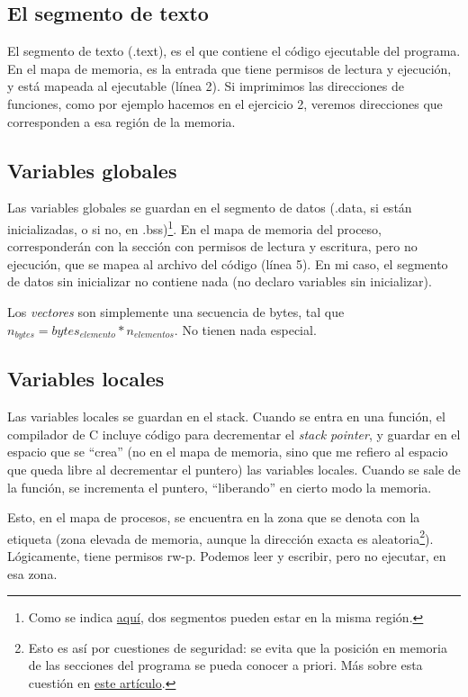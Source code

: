 \documentclass[a4paper]{article}
\begin{document}
\subsection{El segmento de texto}

El segmento de texto ({\ttfamily .text}), es el que contiene el código ejecutable del programa. En el mapa de memoria, es la entrada que tiene permisos de lectura y ejecución, y está mapeada al ejecutable (línea 2). Si imprimimos las direcciones de funciones, como por ejemplo hacemos en el ejercicio 2, veremos direcciones que corresponden a esa región de la memoria.

\subsection{Variables globales}

Las variables globales se guardan en el segmento de datos ({\ttfamily.data}, si están inicializadas, o si no, en {\ttfamily.bss})\footnote{Como se indica \href{https://stackoverflow.com/questions/8938303/how-to-get-the-data-and-bss-address-space-in-run-time-in-unix-c-program}{aquí}, dos segmentos pueden estar en la misma región.}. En el mapa de memoria del proceso, corresponderán con la sección con permisos de lectura y escritura, pero no ejecución, que se mapea al archivo del código (línea 5). En mi caso, el segmento de datos sin inicializar no contiene nada (no declaro variables sin inicializar).

Los \emph{vectores} son simplemente una secuencia de bytes, tal que $n_{bytes}=bytes_{elemento}*n_{elementos}$. No tienen nada especial.

\subsection{Variables locales}

Las variables locales se guardan en el stack. Cuando se entra en una función, el compilador de C incluye código para decrementar el \emph{stack pointer}, y guardar en el espacio que se ``crea'' (no en el mapa de memoria, sino que me refiero al espacio que queda libre al decrementar el puntero) las variables locales. Cuando se sale de la función, se incrementa el puntero, ``liberando'' en cierto modo la memoria.

Esto, en el mapa de procesos, se encuentra en la zona que se denota con la etiqueta {\ttfamily [stack]} (zona elevada de memoria, aunque la dirección exacta es aleatoria\footnote{Esto es así por cuestiones de seguridad: se evita que la posición en memoria de las secciones del programa se pueda conocer a priori. Más sobre esta cuestión en \href{https://manybutfinite.com/post/anatomy-of-a-program-in-memory/}{este artículo}.}). Lógicamente, tiene permisos {\ttfamily rw-p}. Podemos leer y escribir, pero no ejecutar, en esa zona.
\end{document}

